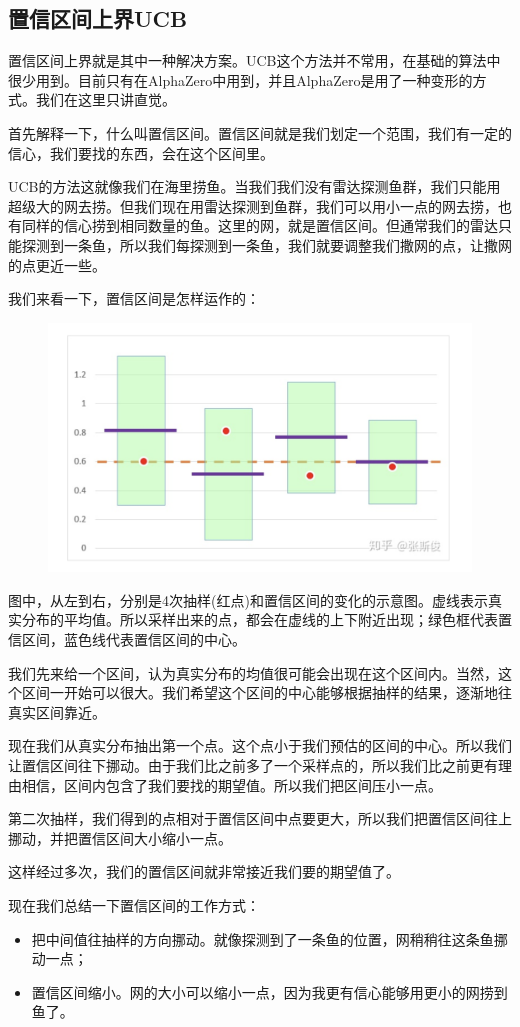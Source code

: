 \documentclass[12pt]{article}
\begin{document}
\subsection{置信区间上界UCB}
置信区间上界就是其中一种解决方案。UCB这个方法并不常用，在基础的算法中很少用到。目前只有在AlphaZero中用到，并且AlphaZero是用了一种变形的方式。我们在这里只讲直觉。

首先解释一下，什么叫置信区间。置信区间就是我们划定一个范围，我们有一定的信心，我们要找的东西，会在这个区间里。

UCB的方法这就像我们在海里捞鱼。当我们我们没有雷达探测鱼群，我们只能用超级大的网去捞。但我们现在用雷达探测到鱼群，我们可以用小一点的网去捞，也有同样的信心捞到相同数量的鱼。这里的网，就是置信区间。但通常我们的雷达只能探测到一条鱼，所以我们每探测到一条鱼，我们就要调整我们撒网的点，让撒网的点更近一些。

我们来看一下，置信区间是怎样运作的：
\begin{figure}[H]
    \centering
    \includegraphics[width=.6\textwidth]{fig/ReinforcementLearning/AlphaZero_UCB_Confidence_Interval_1.png}
\end{figure}
图中，从左到右，分别是4次抽样(红点)和置信区间的变化的示意图。虚线表示真实分布的平均值。所以采样出来的点，都会在虚线的上下附近出现；绿色框代表置信区间，蓝色线代表置信区间的中心。

我们先来给一个区间，认为真实分布的均值很可能会出现在这个区间内。当然，这个区间一开始可以很大。我们希望这个区间的中心能够根据抽样的结果，逐渐地往真实区间靠近。

现在我们从真实分布抽出第一个点。这个点小于我们预估的区间的中心。所以我们让置信区间往下挪动。由于我们比之前多了一个采样点的，所以我们比之前更有理由相信，区间内包含了我们要找的期望值。所以我们把区间压小一点。

第二次抽样，我们得到的点相对于置信区间中点要更大，所以我们把置信区间往上挪动，并把置信区间大小缩小一点。

这样经过多次，我们的置信区间就非常接近我们要的期望值了。

现在我们总结一下置信区间的工作方式：
\begin{itemize}
\setlength{\itemsep}{0pt}
\setlength{\parsep}{0pt}
\setlength{\parskip}{0pt}
    \item 把中间值往抽样的方向挪动。就像探测到了一条鱼的位置，网稍稍往这条鱼挪动一点；
    \item 置信区间缩小。网的大小可以缩小一点，因为我更有信心能够用更小的网捞到鱼了。
\end{itemize}
\end{document}
